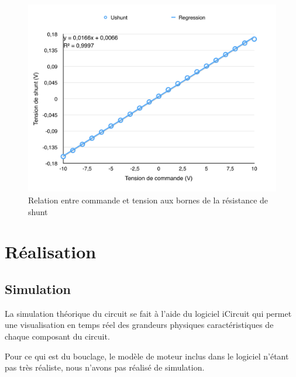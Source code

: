 \documentclass[a4paper]{article}
\begin{document}
\begin{figure}[H]
	\centering
	\includegraphics[width=1\textwidth]{graph_shunt.png}
	\caption{Relation entre commande et tension aux bornes de la résistance de shunt}
\end{figure}



\section{Réalisation}

\subsection{Simulation}

La simulation théorique du circuit se fait à l'aide du logiciel iCircuit qui permet une visualisation en temps réel des grandeurs physiques caractéristiques de chaque composant du circuit.

Pour ce qui est du bouclage, le modèle de moteur inclus dans le logiciel n'étant pas très réaliste, nous n'avons pas réalisé de simulation.
\end{document}
